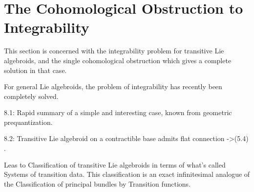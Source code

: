\section{The Cohomological Obstruction to Integrability}

This section is concerned with the integrability problem for transitive Lie algebroids, and the single cohomological obstruction which gives a complete solution in that case.

\quad For general Lie algebroids, the problem of integrability has recently been completely solved.

8.1: Rapid summary of a simple and interesting case, known from geometric prequantization.

8.2: Transitive Lie algebroid on a contractible base admits flat connection ->(5.4) .

\quad Leas to Classification of transitive Lie algebroids in terms of what's called Systems of transition data. This classification is an exact infinitesimal analogue of the Classification of principal bundles by Transition functions.

\subsection{}

\subsection{}
